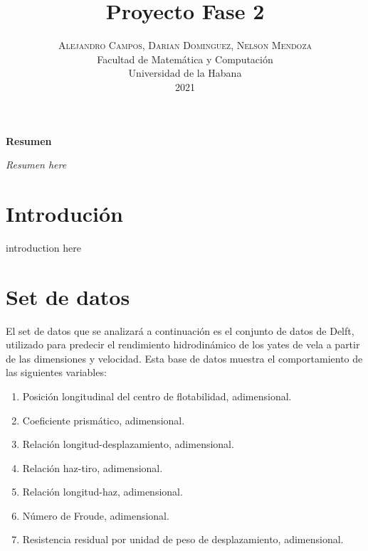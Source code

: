 \documentclass[twoside]{article}
\title{\vspace{-0.5cm}\fontsize{20pt}{10pt}\selectfont\textbf{Proyecto Fase 2}}
\author{
\large
\textsc{\vspace{-2cm} Alejandro Campos, Darian Dominguez, Nelson Mendoza}\\[3.5cm]
\normalsize Facultad de Matem\'atica y Computaci\'on \\
\normalsize Universidad de la Habana \\
\normalsize 2021 \\
\vspace{-5mm}
}
\date{}
\begin{document}
\maketitle

\thispagestyle{fancy} 

\begin{center}
\textbf{Resumen}
\end{center}
\noindent \textit{Resumen here}\\

\begin{multicols}{2}

\section{Introduci\'on}
introduction here





\section{Set de datos}
El set de datos que se analizar\'a a continuaci\'on es el conjunto de datos de Delft, utilizado para predecir el rendimiento hidrodin\'amico de los yates de vela a partir de las dimensiones y velocidad. Esta base de datos muestra el comportamiento de las siguientes variables:
\begin{enumerate}
\item Posici\'on longitudinal del centro de flotabilidad, adimensional.
\item Coeficiente prism\'atico, adimensional.
\item Relaci\'on longitud-desplazamiento, adimensional.
\item Relaci\'on haz-tiro, adimensional.
\item Relaci\'on longitud-haz, adimensional.
\item N\'umero de Froude, adimensional.
\item Resistencia residual por unidad de peso de desplazamiento, adimensional.\\
\end{enumerate}


\end{multicols}
\end{document}
